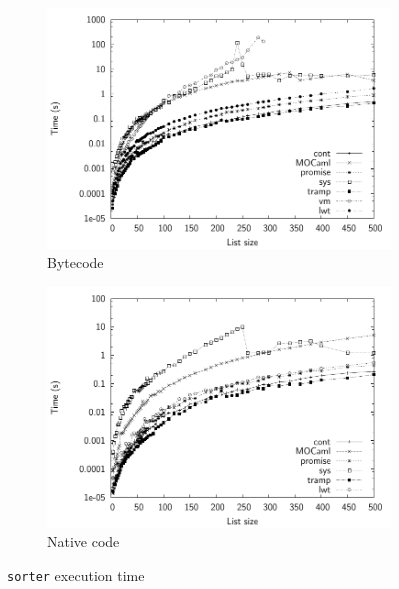 \documentclass[12pt,twoside,notitlepage]{report}
\theoremstyle{plain}%
\theoremstyle{definition}
\theoremstyle{remark}
\begin{document}
\begin{figure}[h]
\centering
\begin{subfigure}[b]{0.8\linewidth}
\includegraphics[width=\linewidth]{./sorter_exec_times_bw}
\caption{Bytecode}
\label{fig:sorter_exec_times_bc}
\end{subfigure}
\begin{subfigure}[b]{0.8\linewidth}
\includegraphics[width=\linewidth]{./sorter_exec_times_opt_bw}
\caption{Native code}
\label{fig:sorter_exec_times_nat}
\end{subfigure}
\cprotect\caption{\verb|sorter| execution time}
\label{fig:sorter_exec_times}
\end{figure}
\end{document}
